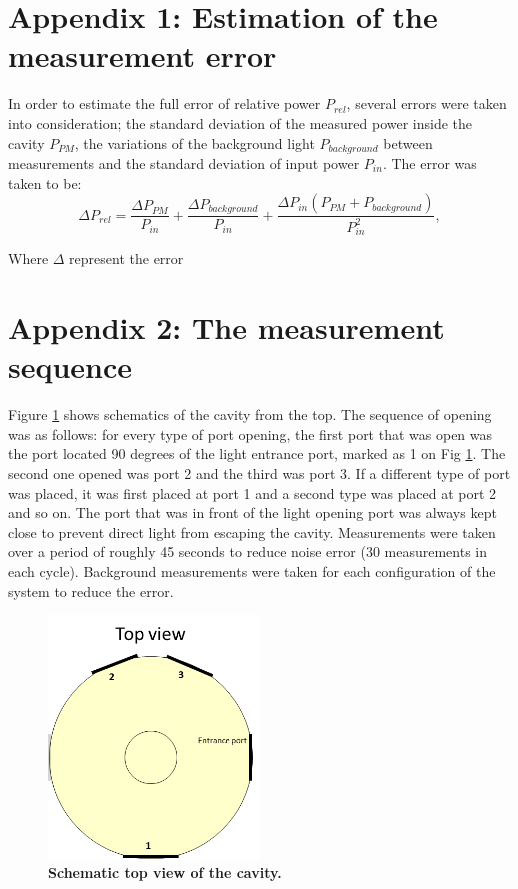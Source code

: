 \documentclass[a4paper]{article}
\begin{document}
\begin{appendices}
\section*{Appendix 1: Estimation of the measurement error}
In order to estimate the full error of relative power $P_{rel}$, several errors were taken into consideration; the standard deviation of the measured power inside the cavity $P_{PM}$, the variations of the background light $P_{background}$ between measurements and the standard deviation of input power $P_{in}$. The error was taken to be:
\begin{equation}\label{eq_error}
\Delta P_{rel}=\frac{\Delta P_{PM}}{P_{in}}+\frac{\Delta P_{background}}{P_{in}}+\frac{\Delta P_{in}(P_{PM}+P_{background})}{P_{in}^{2}},
\end{equation}

\noindent Where $\Delta$ represent the error

\section*{Appendix 2: The measurement sequence}
Figure \ref{fig:cavity_top_view} shows schematics of the cavity from the top. The sequence of opening was as follows:  for every type of port opening, the first port that was open was the port located 90 degrees of the light entrance port, marked as 1 on Fig \ref{fig:cavity_top_view}. The second one opened was port 2 and the third was port 3. If a different type of port was placed, it was first placed at port 1 and a second type was placed at port 2 and so on. The port that was in front of the light opening port was always kept close to prevent direct light from escaping the cavity. Measurements were taken over a period of roughly 45 seconds to reduce noise error (30 measurements in each cycle). Background measurements were taken for each configuration of the system to reduce the error. 

\begin{figure}
\centering
\includegraphics[width=0.5\textwidth]{figures/measurement_sequence.png}
\caption{\textbf{Schematic top view of the cavity.}}
\label{fig:cavity_top_view}
\end{figure}

\end{appendices}

%


\end{document}
